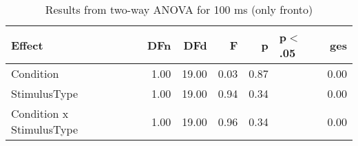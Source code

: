 \begin{table}[ht]
\centering
\begin{tabulary}{\textwidth}{lrrrrlr}
  \toprule
Effect & DFn & DFd & F & p & p$<$.05 & ges \\ 
  \midrule
Condition & 1.00 & 19.00 & 0.03 & 0.87 &  & 0.00 \\ 
  StimulusType & 1.00 & 19.00 & 0.94 & 0.34 &  & 0.00 \\ 
  Condition x StimulusType & 1.00 & 19.00 & 0.96 & 0.34 &  & 0.00 \\ 
   \bottomrule
\end{tabulary}
\caption{Results from two-way ANOVA for 100 ms (only fronto)} 
\end{table}
